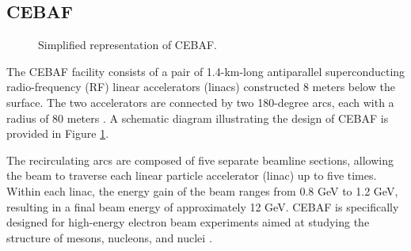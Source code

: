 \subsection{CEBAF}
\label{11.100::cebaf}
    \begin{figure}[b!]
        \caption[Continuous Electron Beam Accelerator Facility (CEBAF)]
        {Simplified representation of CEBAF.}
        \label{fig::11.100::cebaf}
    \end{figure}

    The CEBAF facility consists of a pair of 1.4-km-long antiparallel superconducting radio-frequency (RF) linear accelerators (linacs) constructed 8 meters below the surface.
    The two accelerators are connected by two 180-degree arcs, each with a radius of 80 meters \cite{leemann2001}.
    A schematic diagram illustrating the design of CEBAF is provided in Figure \ref{fig::11.100::cebaf}.

    The recirculating arcs are composed of five separate beamline sections, allowing the beam to traverse each linear particle accelerator (linac) up to five times.
    Within each linac, the energy gain of the beam ranges from 0.8 GeV to 1.2 GeV, resulting in a final beam energy of approximately 12 GeV.
    CEBAF is specifically designed for high-energy electron beam experiments aimed at studying the structure of mesons, nucleons, and nuclei \cite{rode2010}.
